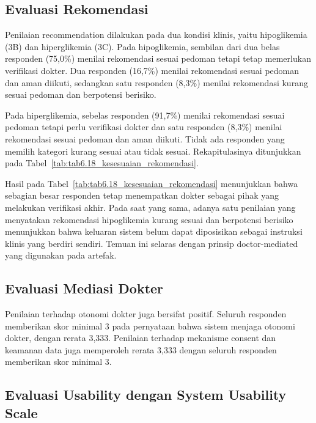 \subsection{Evaluasi Rekomendasi}
\label{subsec:bab6-evaluasi-recommendation}

Penilaian recommendation dilakukan pada dua kondisi klinis, yaitu hipoglikemia (3B) dan hiperglikemia (3C). Pada hipoglikemia, sembilan dari dua belas
responden (75,0\%) menilai rekomendasi sesuai pedoman tetapi tetap memerlukan verifikasi dokter. Dua responden (16,7\%) menilai rekomendasi sesuai pedoman
dan aman diikuti, sedangkan satu responden (8,3\%) menilai rekomendasi kurang sesuai pedoman dan berpotensi berisiko.

Pada hiperglikemia, sebelas responden (91,7\%) menilai rekomendasi sesuai pedoman tetapi perlu verifikasi dokter dan satu responden (8,3\%) menilai
rekomendasi sesuai pedoman dan aman diikuti. Tidak ada responden yang memilih kategori kurang sesuai atau tidak sesuai. Rekapitulasinya ditunjukkan pada Tabel~\ref{tab:tab6.18_kesesuaian_rekomendasi}.



Hasil pada Tabel~\ref{tab:tab6.18_kesesuaian_rekomendasi} menunjukkan bahwa sebagian besar responden tetap menempatkan dokter sebagai pihak yang melakukan verifikasi akhir. Pada saat yang sama,
adanya satu penilaian yang menyatakan rekomendasi hipoglikemia kurang sesuai dan berpotensi berisiko menunjukkan bahwa keluaran sistem belum dapat
diposisikan sebagai instruksi klinis yang berdiri sendiri. Temuan ini selaras dengan prinsip doctor-mediated yang digunakan pada artefak.

\subsection{Evaluasi Mediasi Dokter}
\label{subsec:bab6-evaluasi-doctor-mediation}

Penilaian terhadap otonomi dokter juga bersifat positif. Seluruh responden memberikan skor minimal 3 pada pernyataan bahwa sistem menjaga otonomi dokter,
dengan rerata 3,333. Penilaian terhadap mekanisme consent dan keamanan data juga memperoleh rerata 3,333 dengan seluruh responden memberikan skor minimal 3.

\subsection{Evaluasi Usability dengan System Usability Scale}
\label{subsec:bab6-evaluasi-sus}


